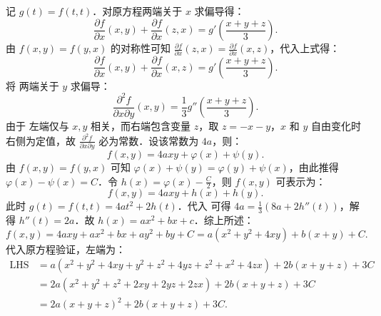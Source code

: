 \begin{solution}

    记 $g(t) = f(t,t)$．对原方程两端关于 $x$ 求偏导得：
    \begin{equation}
        \frac{\partial f}{\partial x}(x,y) + \frac{\partial f}{\partial x}(z,x) = g'\left( \frac{x+y+z}{3} \right).
    \end{equation}
    由 $f(x,y) = f(y,x)$ 的对称性可知 $\frac{\partial f}{\partial x}(z,x) = \frac{\partial f}{\partial x}(x,z)$，代入上式得：
    \begin{equation}
        \frac{\partial f}{\partial x}(x,y) + \frac{\partial f}{\partial x}(x,z) = g'\left( \frac{x+y+z}{3} \right). \label{eq:partial-x-1}
    \end{equation}
    将  两端关于 $y$ 求偏导：
    \begin{equation}
        \frac{\partial^2 f}{\partial x \partial y}(x,y) = \frac{1}{3} g''\left( \frac{x+y+z}{3} \right). \label{eq:second-partial-1}
    \end{equation}
    由于  左端仅与 $x,y$ 相关，而右端包含变量 $z$，取 $z = -x-y$，$x$ 和 $y$ 自由变化时右侧为定值，故 $\frac{\partial^2 f}{\partial x \partial y}$ 必为常数．设该常数为 $4a$，则：
    \begin{equation}
        f(x,y) = 4axy + \varphi(x) + \psi(y).
    \end{equation}
    由 $f(x,y) = f(y,x)$ 可知 $\varphi(x) + \psi(y) = \varphi(y) + \psi(x)$，由此推得 $\varphi(x) - \psi(x) = C$．令 $h(x) = \varphi(x) - \frac{C}{2}$，则 $f(x,y)$ 可表示为：
    \begin{equation}
        f(x,y) = 4axy + h(x) + h(y).
    \end{equation}
    此时 $g(t) = f(t,t) = 4at^2 + 2h(t)$．代入  可得 $4a = \frac{1}{3}(8a + 2h''(t))$，解得 $h''(t) = 2a$．故 $h(x) = ax^2 + bx + c$．综上所述：
    \begin{equation}
        f(x,y) = 4axy + ax^2 + bx + ay^2 + by + C = a(x^2 + y^2 + 4xy) + b(x+y) + C.
    \end{equation}
    代入原方程验证，左端为：
    \begin{equation}
        \begin{aligned}
            \text{LHS} & = a(x^2+y^2+4xy + y^2+z^2+4yz + z^2+x^2+4zx) + 2b(x+y+z) + 3C \\
                       & = 2a(x^2+y^2+z^2 + 2xy + 2yz + 2zx) + 2b(x+y+z) + 3C          \\
                       & = 2a(x+y+z)^2 + 2b(x+y+z) + 3C.

\end{aligned}
\end{equation}
\end{solution}
